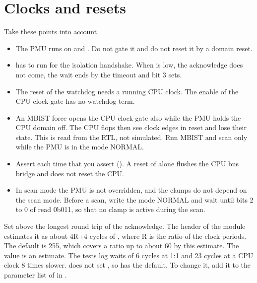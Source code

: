 \section{Clocks and resets}\label{um:ch:power-integration:clocks}
Take these points into account.
\begin{itemize}
  \item The PMU runs on  and . Do not gate it and do not reset it by a domain reset.
  \item {} has to run for the isolation handshake. When  is low, the acknowledge does not come, the wait ends by the timeout and  bit 3 sets.
  \item The reset of the watchdog needs a running CPU clock. The enable of the CPU clock gate has no watchdog term.
  \item An MBIST force opens the CPU clock gate also while the PMU holds the CPU domain off. The CPU flops then see clock edges in reset and lose their state. This is read from the RTL, not simulated. Run MBIST and scan only while the PMU is in the mode NORMAL.
  \item Assert  each time that you assert  (). A reset of  alone flushes the CPU bus bridge and does not reset the CPU.
  \item In scan mode the PMU is not overridden, and the clamps do not depend on the scan mode. Before a scan, write the mode NORMAL and wait until bits 2 to 0 of  read 0b011, so that no clamp is active during the scan.
\end{itemize}
Set  above the longest round trip of the acknowledge. The header of the module estimates it as about 4R+4 cycles of , where R is the ratio of the clock periods. The default is 255, which covers a ratio up to about 60 by this estimate. The value is an estimate. The tests log waits of 6 cycles at 1:1 and 23 cycles at a CPU clock 8 times slower.  does not set , so  has the default. To change it, add it to the parameter list of  in .

